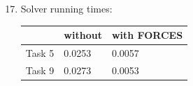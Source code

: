 \documentclass[11pt]{article}
\begin{document}
\begin{enumerate}
    \setcounter{enumi}{16}
    \item Solver running times:
	\begin{center}    
    \begin{tabular}{|l||l|l|}
    \hline
    &without&with FORCES\\
    \hline
    \hline
    Task 5&0.0253&0.0057\\
    \hline
    Task 9&0.0273&0.0053\\
    \hline
    \end{tabular}
    \end{center}
\end{enumerate}

\end{document}
